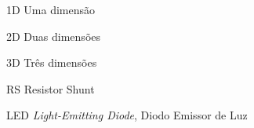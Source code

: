 \begin{siglas}
	\item[1D] Uma dimensão
	\item[2D] Duas dimensões
	\item[3D] Três dimensões
	\item[RS] Resistor Shunt
	\item[LED] \textit{Light-Emitting Diode}, Diodo Emissor de Luz
\end{siglas}